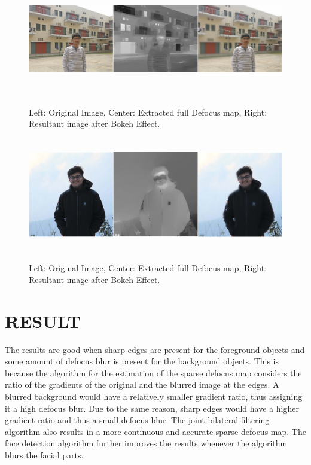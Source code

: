 \documentclass[letterpaper, 10 pt, conference]{ieeeconf}  %
\begin{document}
\begin{figure}[h]
\centering
\includegraphics[width=16cm, height=5cm]{out.png}
\label{fig:subim14}
\caption{Left: Original Image, Center: Extracted full Defocus map, Right: Resultant image after Bokeh Effect.}
\end{figure}
\begin{figure}[h]
\centering
\includegraphics[width=16cm, height=5cm]{out2.png}
\label{fig:subim14}
\caption{Left: Original Image, Center: Extracted full Defocus map, Right: Resultant image after Bokeh Effect.}
\end{figure}
\section{RESULT}

The results are good when sharp edges are present for the foreground objects and some amount of defocus blur is present for the background objects. This is because the algorithm for the estimation of the sparse defocus map considers the ratio of the gradients of the original and the blurred image at the edges. A blurred background would have a relatively smaller gradient ratio, thus assigning it a high defocus blur. Due to the same reason, sharp edges would have a higher gradient ratio and thus a small defocus blur. The joint bilateral filtering algorithm also results in a more continuous and accurate sparse defocus map. The face detection algorithm further improves the results whenever the algorithm blurs the facial parts. 
\end{document}
